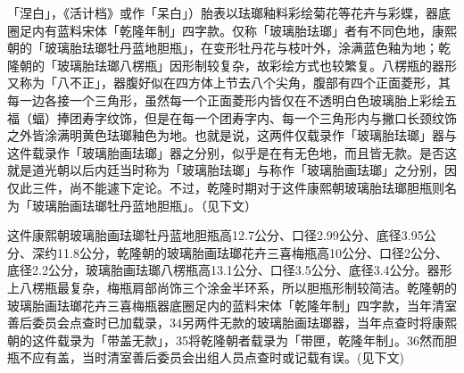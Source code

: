 \vfill
\begin{BookNotes}
\end{BookNotes}

\noindent 「涅白」，《活计档》或作「呆白」）胎表以珐瑯釉料彩绘菊花等花卉与彩蝶，器底圈足内有蓝料宋体「乾隆年制」四字款。仅称「玻璃胎珐瑯」者有不同色地，康熙朝的「玻璃胎珐瑯牡丹蓝地胆瓶」，在变形牡丹花与枝叶外，涂满蓝色釉为地；乾隆朝的「玻璃胎珐瑯八楞瓶」因形制较复杂，故彩绘方式也较繁复。八楞瓶的器形又称为「八不正」，器腹好似在四方体上节去八个尖角，腹部有四个正面菱形，其每一边各接一个三角形，虽然每一个正面菱形内皆仅在不透明白色玻璃胎上彩绘五福（蝠）捧团寿字纹饰，但是在每一个团寿字内、每一个三角形内与撇口长颈纹饰之外皆涂满明黄色珐瑯釉色为地。也就是说，这两件仅载录作「玻璃胎珐瑯」器与这件载录作「玻璃胎画珐瑯」器之分别，似乎是在有无色地，而且皆无款。是否这就是道光朝以后内廷当时称为「玻璃胎珐瑯」与称作「玻璃胎画珐瑯」之分别，因仅此三件，尚不能遽下定论。不过，乾隆时期对于这件康熙朝玻璃胎珐瑯胆瓶则名为「玻璃胎画珐瑯牡丹蓝地胆瓶」。（见下文）

这件康熙朝玻璃胎画珐瑯牡丹蓝地胆瓶高12.7公分、口径2.99公分、底径3.95公分、深约11.8公分，乾隆朝的玻璃胎画珐瑯花卉三喜梅瓶高10公分、口径2公分、底径2.2公分，玻璃胎画珐瑯八楞瓶高13.1公分、口径3.5公分、底径3.4公分。器形上八楞瓶最复杂，梅瓶肩部尚饰三个涂金半环系，所以胆瓶形制较简洁。乾隆朝的玻璃胎画珐瑯花卉三喜梅瓶器底圈足内的蓝料宋体「乾隆年制」四字款，当年清室善后委员会点查时已加载录，34另两件无款的玻璃胎画珐瑯器，当年点查时将康熙朝的这件载录为「带盖无款」，35将乾隆朝者载录为「带匣，乾隆年制」。36然而胆瓶不应有盖，当时清室善后委员会出组人员点查时或记载有误。(见下文)

